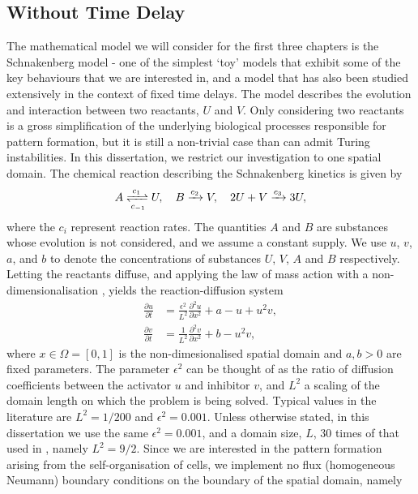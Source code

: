 \subsection{Without Time Delay}
The mathematical model we will consider for the first three chapters is the Schnakenberg model \cite{schnakenberg} - one of the simplest `toy' models that exhibit some of the key behaviours that we are interested in, and a model that has also been studied extensively in the context of fixed time delays. The model describes the evolution and interaction between two reactants, $U$ and $V$. Only considering two reactants is a gross simplification of the underlying biological processes responsible for pattern formation, but it is still a non-trivial case than can admit Turing instabilities. In this dissertation, we restrict our investigation to one spatial domain. The chemical reaction describing the Schnakenberg kinetics \cite{baker} is given by
\begin{equation}\label{chem}
A\xrightleftharpoons[c_{-1}]{c_1} U,\quad B\xrightarrow{c_2} V,\quad 2U+V\xrightarrow{c_3} 3U,
\end{equation}
where the $c_i$ represent reaction rates. The quantities $A$ and $B$ are substances whose evolution is not considered, and we assume a constant supply. We use $u$, $v$, $a$, and $b$ to denote the concentrations of substances $U$, $V$, $A$ and $B$ respectively. Letting the reactants diffuse, and applying the law of mass action with a non-dimensionalisation \cite{murray}, yields the reaction-diffusion system
\begin{equation}\label{system}
    \begin{split}
    \frac{\partial u}{\partial t}&=\frac{\epsilon^2}{L^2}\frac{\partial^2 u}{\partial x^2}+a-u+u^2v,\\
    \frac{\partial v}{\partial t}&=\frac{1}{L^2}\frac{\partial^2 v}{\partial x^2}+b-u^2v,
    \end{split}
\end{equation}
where $x\in\Omega=[0,1]$ is the non-dimesionalised spatial domain and $a,b>0$ are fixed parameters. The parameter $\epsilon^2$ can be thought of as the ratio of diffusion coefficients between the activator $u$ and inhibitor $v$, and $L^2$ a scaling of the domain length on which the problem is being solved. Typical values in the literature \cite{gaffmonk} are $L^2=1/200$ and $\epsilon^2=0.001$. Unless otherwise stated, in this dissertation we use the same $\epsilon^2=0.001$, and a domain size, $L$, $30$ times of that used in \cite{gaffmonk}, namely $L^2=9/2$. Since we are interested in the pattern formation arising from the self-organisation of cells, we implement no flux (homogeneous Neumann) boundary conditions on the boundary of the spatial domain, namely
